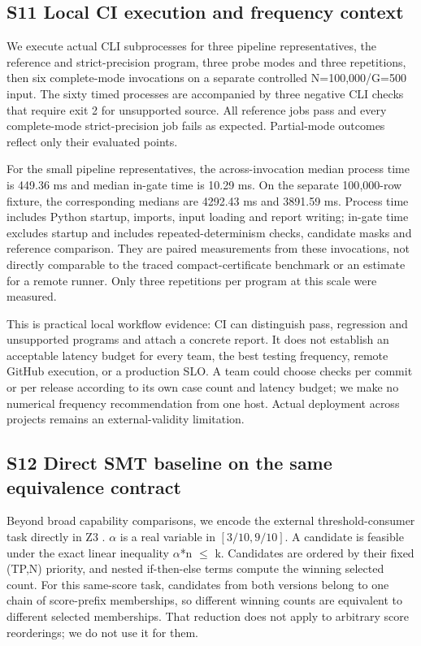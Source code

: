 \documentclass[11pt,a4paper]{article}
\theoremstyle{plain}
\theoremstyle{definition}
\theoremstyle{remark}
\begin{document}
\subsection*{S11 Local CI execution and frequency context}\label{sec:s11}

We execute actual CLI subprocesses for three pipeline representatives, the reference and strict-precision program, three probe modes and three repetitions, then six complete-mode invocations on a separate controlled N=100{,}000/G=500 input. The sixty timed processes are accompanied by three negative CLI checks that require exit 2 for unsupported source. All reference jobs pass and every complete-mode strict-precision job fails as expected. Partial-mode outcomes reflect only their evaluated points.

For the small pipeline representatives, the across-invocation median process time is 449.36 ms and median in-gate time is 10.29 ms. On the separate 100{,}000-row fixture, the corresponding medians are 4292.43 ms and 3891.59 ms. Process time includes Python startup, imports, input loading and report writing; in-gate time excludes startup and includes repeated-determinism checks, candidate masks and reference comparison. They are paired measurements from these invocations, not directly comparable to the traced compact-certificate benchmark or an estimate for a remote runner. Only three repetitions per program at this scale were measured.

This is practical local workflow evidence: CI can distinguish pass, regression and unsupported programs and attach a concrete report. It does not establish an acceptable latency budget for every team, the best testing frequency, remote GitHub execution, or a production SLO. A team could choose checks per commit or per release according to its own case count and latency budget; we make no numerical frequency recommendation from one host. Actual deployment across projects remains an external-validity limitation.


\subsection*{S12 Direct SMT baseline on the same equivalence contract}\label{sec:s12}

Beyond broad capability comparisons, we encode the external threshold-consumer task directly in Z3 \cite{demoura2008z3}. $\alpha$ is a real variable in $[3/10, 9/10]$. A candidate is feasible under the exact linear inequality $\alpha$*n $\le$ k. Candidates are ordered by their fixed (TP,N) priority, and nested if-then-else terms compute the winning selected count. For this same-score task, candidates from both versions belong to one chain of score-prefix memberships, so different winning counts are equivalent to different selected memberships. That reduction does not apply to arbitrary score reorderings; we do not use it for them.
\end{document}
